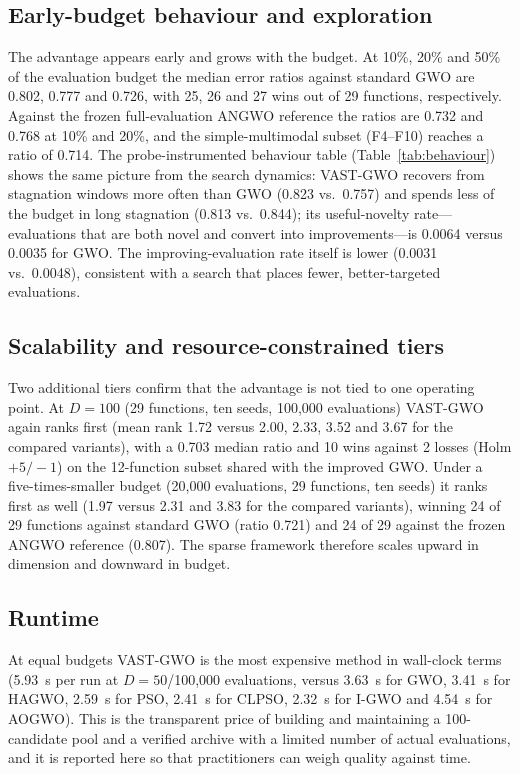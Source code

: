\documentclass[journal]{IEEEtran}
\newcommand{\method}{VAST-GWO}
\begin{document}
\subsection{Early-budget behaviour and exploration}
The advantage appears early and grows with the budget. At 10\%, 20\% and 50\%
of the evaluation budget the median error ratios against standard GWO are
0.802, 0.777 and 0.726, with 25, 26 and 27 wins out of 29 functions,
respectively. Against the frozen full-evaluation ANGWO reference the ratios
are 0.732 and 0.768 at 10\% and 20\%, and the simple-multimodal subset
(F4--F10) reaches a ratio of 0.714. The probe-instrumented behaviour table
(Table~\ref{tab:behaviour}) shows the same picture from the search dynamics:
\method{} recovers from stagnation windows more often than GWO
(0.823 vs.\ 0.757) and spends less of the budget in long stagnation
(0.813 vs.\ 0.844); its useful-novelty rate---evaluations that are both novel
and convert into improvements---is 0.0064 versus 0.0035 for GWO. The
improving-evaluation rate itself is lower (0.0031 vs.\ 0.0048), consistent
with a search that places fewer, better-targeted evaluations.

\begin{table}[t]
\centering
\small
\caption{Behaviour metrics on the formal tier (probe-instrumented methods).}
\label{tab:behaviour}
\resizebox{\columnwidth}{!}{}
\end{table}

\subsection{Scalability and resource-constrained tiers}
Two additional tiers confirm that the advantage is not tied to one operating
point. At $D=100$ (29 functions, ten seeds, 100{,}000 evaluations)
\method{} again ranks first (mean rank 1.72 versus 2.00, 2.33, 3.52 and 3.67
for the compared variants), with a 0.703 median ratio and 10 wins against 2
losses (Holm $+5/-1$) on the 12-function subset shared with the improved GWO.
Under a five-times-smaller budget (20{,}000 evaluations, 29 functions, ten
seeds) it ranks first as well (1.97 versus 2.31 and 3.83 for the compared
variants), winning 24 of 29 functions against standard GWO (ratio 0.721) and
24 of 29 against the frozen ANGWO reference (0.807). The sparse framework
therefore scales upward in dimension and downward in budget.

\subsection{Runtime}
At equal budgets \method{} is the most expensive method in wall-clock terms
(5.93~s per run at $D=50$/100{,}000 evaluations, versus 3.63~s for GWO,
3.41~s for HAGWO, 2.59~s for PSO, 2.41~s for CLPSO, 2.32~s for I-GWO and
4.54~s for AOGWO). This is the transparent price of building and maintaining
a 100-candidate pool and a verified archive with a limited number of actual
evaluations, and it is reported here so that practitioners can weigh quality
against time.
\end{document}
